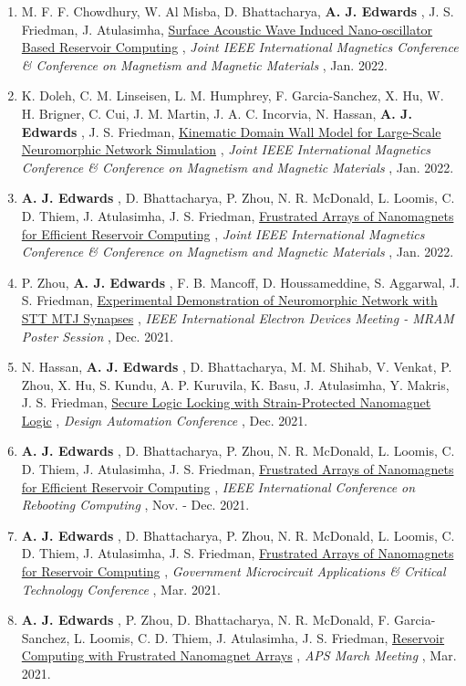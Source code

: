 \documentclass[12pt]{article}
\begin{document}
\begin{enumerate}
\item M. F. F. Chowdhury, W. Al Misba, D. Bhattacharya, \textbf{A. J. Edwards} , J. S. Friedman, J. Atulasimha, \ul{Surface Acoustic Wave Induced Nano-oscillator Based Reservoir Computing} , \textit{Joint IEEE International Magnetics Conference \& Conference on Magnetism and Magnetic Materials} , Jan. 2022.
\item K. Doleh, C. M. Linseisen, L. M. Humphrey, F. Garcia-Sanchez, X. Hu, W. H. Brigner, C. Cui, J. M. Martin, J. A. C. Incorvia, N. Hassan, \textbf{A. J. Edwards} , J. S. Friedman, \ul{Kinematic Domain Wall Model for Large-Scale Neuromorphic Network Simulation} , \textit{Joint IEEE International Magnetics Conference \& Conference on Magnetism and Magnetic Materials} , Jan. 2022.
\item \textbf{A. J. Edwards} , D. Bhattacharya, P. Zhou, N. R. McDonald, L. Loomis, C. D. Thiem, J. Atulasimha, J. S. Friedman, \ul{Frustrated Arrays of Nanomagnets for Efficient Reservoir Computing} , \textit{Joint IEEE International Magnetics Conference \& Conference on Magnetism and Magnetic Materials} , Jan. 2022.
\item P. Zhou, \textbf{A. J. Edwards} , F. B. Mancoff, D. Houssameddine, S. Aggarwal, J. S. Friedman, \ul{Experimental Demonstration of Neuromorphic Network with STT MTJ Synapses} , \textit{IEEE International Electron Devices Meeting - MRAM Poster Session} , Dec. 2021.
\item N. Hassan, \textbf{A. J. Edwards} , D. Bhattacharya, M. M. Shihab, V. Venkat, P. Zhou, X. Hu, S. Kundu, A. P. Kuruvila, K. Basu, J. Atulasimha, Y. Makris, J. S. Friedman, \href{Papers/HassanNMLDAC2021.pdf}{Secure Logic Locking with Strain-Protected Nanomagnet Logic} , \textit{Design Automation Conference} , Dec. 2021.
\item \textbf{A. J. Edwards} , D. Bhattacharya, P. Zhou, N. R. McDonald, L. Loomis, C. D. Thiem, J. Atulasimha, J. S. Friedman, \ul{Frustrated Arrays of Nanomagnets for Efficient Reservoir Computing} , \textit{IEEE International Conference on Rebooting Computing} , Nov. - Dec. 2021.
\item \textbf{A. J. Edwards} , D. Bhattacharya, P. Zhou, N. R. McDonald, L. Loomis, C. D. Thiem, J. Atulasimha, J. S. Friedman, \ul{Frustrated Arrays of Nanomagnets for Reservoir Computing} , \textit{Government Microcircuit Applications \& Critical Technology Conference} , Mar. 2021.
\item \textbf{A. J. Edwards} , P. Zhou, D. Bhattacharya, N. R. McDonald, F. Garcia-Sanchez, L. Loomis, C. D. Thiem, J. Atulasimha, J. S. Friedman, \ul{Reservoir Computing with Frustrated Nanomagnet Arrays} , \textit{APS March Meeting} , Mar. 2021.

\end{enumerate}
\end{document}
